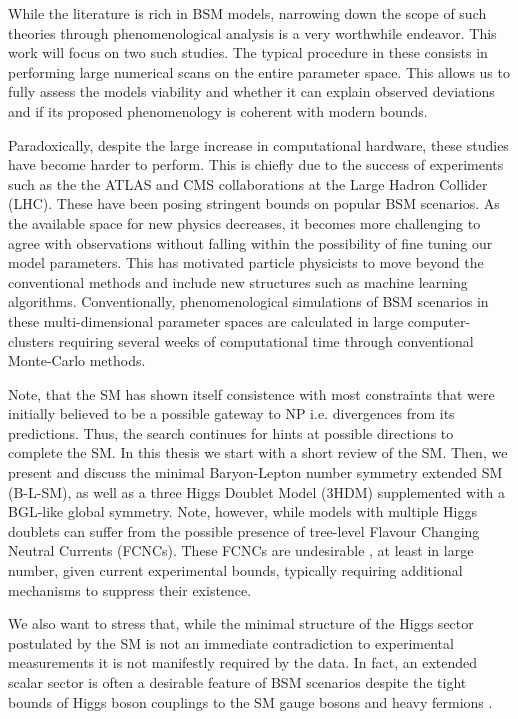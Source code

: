 \documentclass[10pt]{report}
\begin{document}
While the literature is rich in BSM models, narrowing down the scope of such theories through phenomenological analysis is a very worthwhile endeavor. This work will focus on two such studies. The typical procedure in these consists in performing large numerical scans on the entire parameter space. This allows us to fully assess the models viability and whether it can explain observed deviations and if its proposed phenomenology is coherent with modern bounds. 

Paradoxically, despite the large increase in computational hardware, these studies have become harder to perform. This is chiefly due to the success of experiments such as the the ATLAS and CMS collaborations at the Large Hadron Collider (LHC). These have been posing stringent bounds on popular BSM scenarios. As the available space for new physics decreases, it becomes more challenging to agree with observations without falling within the possibility of fine tuning our model parameters. This has motivated particle physicists to move beyond the conventional methods and include new structures such as machine learning  algorithms. Conventionally, phenomenological simulations of BSM scenarios in these multi-dimensional parameter spaces are calculated in large computer-clusters requiring several weeks of computational time through conventional Monte-Carlo methods.

Note, that the SM has shown itself consistence with most constraints that were initially believed to be a possible gateway to NP i.e. divergences from its predictions. Thus, the search continues for hints at possible directions to complete the SM. 
%
In this thesis we start with a short review of the SM. Then, we present and discuss the minimal Baryon-Lepton number symmetry extended SM (B-L-SM), as well as a three Higgs Doublet Model (3HDM) supplemented with a BGL-like global symmetry. Note, however, while models with multiple Higgs doublets can suffer from the possible presence of tree-level Flavour Changing Neutral Currents (FCNCs). These FCNCs are undesirable \cite{ILYUSHIN2020114921}, at least in large number, given current experimental bounds, typically requiring additional mechanisms to suppress their existence. 

We also want to stress that, while the minimal structure of the Higgs sector postulated by the SM is not an immediate contradiction to experimental measurements it is not manifestly required by the data. In fact, an extended scalar sector is often a desirable feature of BSM scenarios despite the tight bounds of Higgs boson couplings to the SM gauge bosons and heavy fermions \cite{10.1093/ptep/ptaa104}. 
\end{document}
